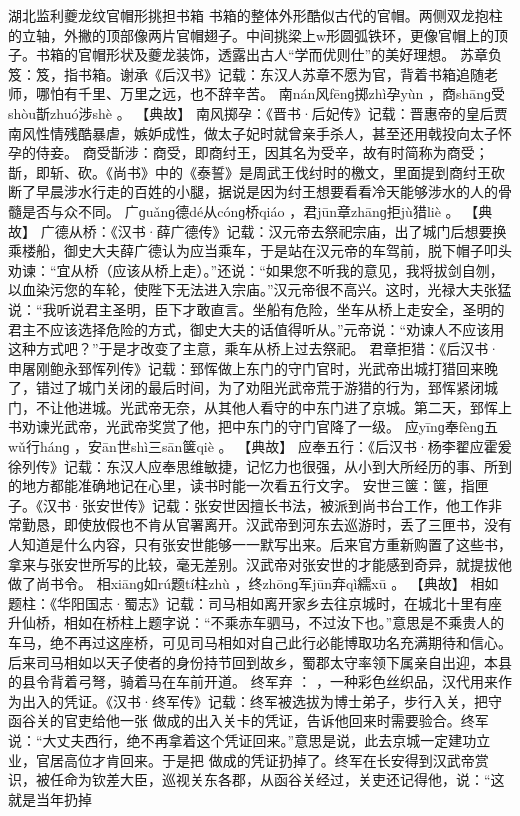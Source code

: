 \documentclass[12pt,UTF8]{ctexbook}
\begin{document}
湖北监利夔龙纹官帽形挑担书箱
书箱的整体外形酷似古代的官帽。两侧双龙抱柱的立轴，外撇的顶部像两片官帽翅子。中间挑梁上w形圆弧铁环，更像官帽上的顶子。书箱的官帽形状及夔龙装饰，透露出古人“学而优则仕”的美好理想。
苏章负笈：笈，指书箱。谢承《后汉书》记载：东汉人苏章不愿为官，背着书箱追随老师，哪怕有千里、万里之远，也不辞辛苦。
南nán风fēnɡ掷zhì孕yùn
，商shānɡ受shòu斮zhuó涉shè
。
【典故】
南风掷孕：《晋书·后妃传》记载：晋惠帝的皇后贾南风性情残酷暴虐，嫉妒成性，做太子妃时就曾亲手杀人，甚至还用戟投向太子怀孕的侍妾。
商受斮涉：商受，即商纣王，因其名为受辛，故有时简称为商受；斮，即斩、砍。《尚书》中的《泰誓》是周武王伐纣时的檄文，里面提到商纣王砍断了早晨涉水行走的百姓的小腿，据说是因为纣王想要看看冷天能够涉水的人的骨髓是否与众不同。
广ɡuǎnɡ德dé从cónɡ桥qiáo
，君jūn章zhānɡ拒jù猎liè
。
【典故】
广德从桥：《汉书·薛广德传》记载：汉元帝去祭祀宗庙，出了城门后想要换乘楼船，御史大夫薛广德认为应当乘车，于是站在汉元帝的车驾前，脱下帽子叩头劝谏：“宜从桥（应该从桥上走）。”还说：“如果您不听我的意见，我将拔剑自刎，以血染污您的车轮，使陛下无法进入宗庙。”汉元帝很不高兴。这时，光禄大夫张猛说：“我听说君主圣明，臣下才敢直言。坐船有危险，坐车从桥上走安全，圣明的君主不应该选择危险的方式，御史大夫的话值得听从。”元帝说：“劝谏人不应该用这种方式吧？”于是才改变了主意，乘车从桥上过去祭祀。
君章拒猎：《后汉书·申屠刚鲍永郅恽列传》记载：郅恽做上东门的守门官时，光武帝出城打猎回来晚了，错过了城门关闭的最后时间，为了劝阻光武帝荒于游猎的行为，郅恽紧闭城门，不让他进城。光武帝无奈，从其他人看守的中东门进了京城。第二天，郅恽上书劝谏光武帝，光武帝奖赏了他，把中东门的守门官降了一级。
应yīnɡ奉fènɡ五wǔ行hánɡ
，安ān世shì三sān箧qiè
。
【典故】
应奉五行：《后汉书·杨李翟应霍爰徐列传》记载：东汉人应奉思维敏捷，记忆力也很强，从小到大所经历的事、所到的地方都能准确地记在心里，读书时能一次看五行文字。
安世三箧：箧，指匣子。《汉书·张安世传》记载：张安世因擅长书法，被派到尚书台工作，他工作非常勤恳，即使放假也不肯从官署离开。汉武帝到河东去巡游时，丢了三匣书，没有人知道是什么内容，只有张安世能够一一默写出来。后来官方重新购置了这些书，拿来与张安世所写的比较，毫无差别。汉武帝对张安世的才能感到奇异，就提拔他做了尚书令。
相xiānɡ如rú题tí柱zhù
，终zhōnɡ军jūn弃qì繻xū
。
【典故】
相如题柱：《华阳国志·蜀志》记载：司马相如离开家乡去往京城时，在城北十里有座升仙桥，相如在桥柱上题字说：“不乘赤车驷马，不过汝下也。”意思是不乘贵人的车马，绝不再过这座桥，可见司马相如对自己此行必能博取功名充满期待和信心。后来司马相如以天子使者的身份持节回到故乡，蜀郡太守率领下属亲自出迎，本县的县令背着弓弩，骑着马在车前开道。
终军弃
：
，一种彩色丝织品，汉代用来作为出入的凭证。《汉书·终军传》记载：终军被选拔为博士弟子，步行入关，把守函谷关的官吏给他一张
做成的出入关卡的凭证，告诉他回来时需要验合。终军说：“大丈夫西行，绝不再拿着这个凭证回来。”意思是说，此去京城一定建功立业，官居高位才肯回来。于是把 做成的凭证扔掉了。终军在长安得到汉武帝赏识，被任命为钦差大臣，巡视关东各郡，从函谷关经过，关吏还记得他，说：“这就是当年扔掉
\end{document}

